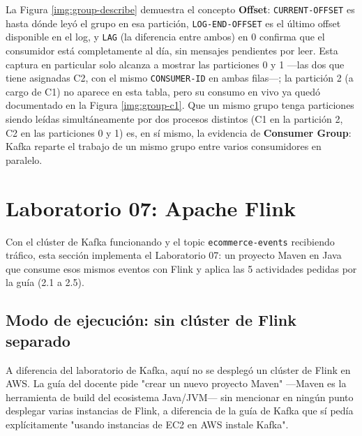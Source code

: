 
		La Figura \ref{img:group-describe} demuestra el concepto \textbf{Offset}: \texttt{CURRENT-OFFSET} es hasta dónde leyó el grupo en esa partición, \texttt{LOG-END-OFFSET} es el último offset disponible en el log, y \texttt{LAG} (la diferencia entre ambos) en 0 confirma que el consumidor está completamente al día, sin mensajes pendientes por leer. Esta captura en particular solo alcanza a mostrar las particiones 0 y 1 —las dos que tiene asignadas C2, con el mismo \texttt{CONSUMER-ID} en ambas filas—; la partición 2 (a cargo de C1) no aparece en esta tabla, pero su consumo en vivo ya quedó documentado en la Figura \ref{img:group-c1}. Que un mismo grupo tenga particiones siendo leídas simultáneamente por dos procesos distintos (C1 en la partición 2, C2 en las particiones 0 y 1) es, en sí mismo, la evidencia de \textbf{Consumer Group}: Kafka reparte el trabajo de un mismo grupo entre varios consumidores en paralelo.


\section{Laboratorio 07: Apache Flink}

	Con el clúster de Kafka funcionando y el topic \texttt{ecommerce-events} recibiendo tráfico, esta sección implementa el Laboratorio 07: un proyecto Maven en Java que consume esos mismos eventos con Flink y aplica las 5 actividades pedidas por la guía (2.1 a 2.5).

	\subsection{Modo de ejecución: sin clúster de Flink separado}

		A diferencia del laboratorio de Kafka, aquí no se desplegó un clúster de Flink en AWS. La guía del docente pide "crear un nuevo proyecto Maven" —Maven es la herramienta de build del ecosistema Java/JVM— sin mencionar en ningún punto desplegar varias instancias de Flink, a diferencia de la guía de Kafka que sí pedía explícitamente "usando instancias de EC2 en AWS instale Kafka".

